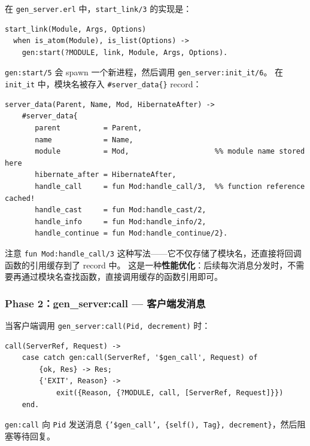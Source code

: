 \documentclass[a4paper,11pt]{article}
\begin{document}
在 \texttt{gen\_server.erl} 中，\texttt{start\_link/3} 的实现是：

\begin{lstlisting}[style=erlangstyle, caption={gen\_server:start\_link/3 源码}]
start_link(Module, Args, Options)
  when is_atom(Module), is_list(Options) ->
    gen:start(?MODULE, link, Module, Args, Options).
\end{lstlisting}

\texttt{gen:start/5} 会 spawn 一个新进程，然后调用 \texttt{gen\_server:init\_it/6}。
在 \texttt{init\_it} 中，模块名被存入 \texttt{\#server\_data\{\}} record：

\begin{lstlisting}[style=erlangstyle, caption={server\_data/4 --- 函数注册的核心}]
server_data(Parent, Name, Mod, HibernateAfter) ->
    #server_data{
       parent          = Parent,
       name            = Name,
       module          = Mod,                    %% module name stored here
       hibernate_after = HibernateAfter,
       handle_call     = fun Mod:handle_call/3,  %% function reference cached!
       handle_cast     = fun Mod:handle_cast/2,
       handle_info     = fun Mod:handle_info/2,
       handle_continue = fun Mod:handle_continue/2}.
\end{lstlisting}

\begin{tipbox}[函数引用缓存]
注意 \texttt{fun Mod:handle\_call/3} 这种写法——它不仅存储了模块名，还直接将回调函数的引用缓存到了 record 中。
这是一种\textbf{性能优化}：后续每次消息分发时，不需要再通过模块名查找函数，直接调用缓存的函数引用即可。
\end{tipbox}

\subsubsection{Phase 2：gen\_server:call --- 客户端发消息}

当客户端调用 \texttt{gen\_server:call(Pid, decrement)} 时：

\begin{lstlisting}[style=erlangstyle, caption={gen\_server:call/2 源码}]
call(ServerRef, Request) ->
    case catch gen:call(ServerRef, '$gen_call', Request) of
        {ok, Res} -> Res;
        {'EXIT', Reason} ->
            exit({Reason, {?MODULE, call, [ServerRef, Request]}})
    end.
\end{lstlisting}

\texttt{gen:call} 向 \texttt{Pid} 发送消息 \texttt{\{'\$gen\_call', \{self(), Tag\}, decrement\}}，然后阻塞等待回复。
\end{document}
